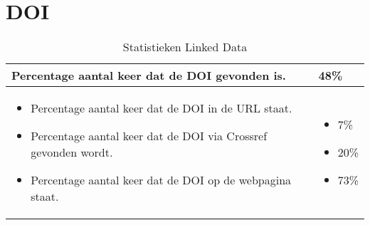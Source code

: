 \section{DOI}
\begin{table}[h!]
    \caption{Statistieken Linked Data}
    \centering
    \begin{tabularx}{\textwidth}{|X|p{4cm}|} 
        \hline
        Percentage aantal keer dat de DOI gevonden is.&48\%\\
        \hline
        \begin{itemize}
            \item Percentage aantal keer dat de DOI in de URL staat.
            \item Percentage aantal keer dat de DOI via Crossref gevonden wordt.
            \item Percentage aantal keer dat de DOI op de webpagina staat.
        \end{itemize}
        &
        \begin{itemize}
            \item 7\%
            \item 20\%
            \item 73\%
        \end{itemize}
        \\
        \hline
    \end{tabularx}
    \label{table:statistieken_linked_data}
\end{table}
